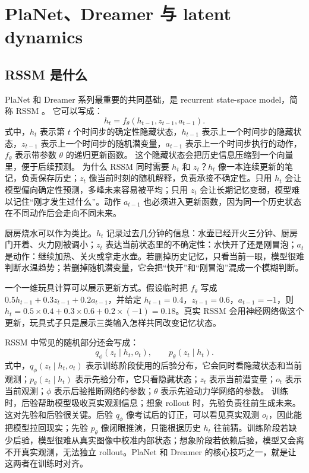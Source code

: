 \documentclass[11pt,a4paper]{ctexart}
\begin{document}
\section{PlaNet、Dreamer 与 latent dynamics}

\subsection{RSSM 是什么}

PlaNet 和 Dreamer 系列最重要的共同基础，是 recurrent state-space model，简称 RSSM \cite{hafner2019planet}。
它可以写成：
\begin{equation}
  h_t = f_\theta(h_{t-1}, z_{t-1}, a_{t-1}).
\end{equation}
式中，$h_t$ 表示第 $t$ 个时间步的确定性隐藏状态，$h_{t-1}$ 表示上一个时间步的隐藏状态，$z_{t-1}$ 表示上一个时间步的随机潜变量，$a_{t-1}$ 表示上一个时间步执行的动作，$f_\theta$ 表示带参数 $\theta$ 的递归更新函数。
这个隐藏状态会把历史信息压缩到一个向量里，便于后续预测。
为什么 RSSM 同时需要 $h_t$ 和 $z_t$？$h_t$ 像一本连续更新的笔记，负责保存历史；$z_t$ 像当前时刻的随机解释，负责承接不确定性。只用 $h_t$ 会让模型偏向确定性预测，多峰未来容易被平均；只用 $z_t$ 会让长期记忆变弱，模型难以记住“刚才发生过什么”。动作 $a_{t-1}$ 也必须进入更新函数，因为同一个历史状态在不同动作后会走向不同未来。

厨房烧水可以作为类比。$h_t$ 记录过去几分钟的信息：水壶已经开火三分钟、厨房门开着、火力刚被调小；$z_t$ 表达当前状态里的不确定性：水快开了还是刚冒泡；$a_t$ 是动作：继续加热、关火或拿走水壶。若删掉历史记忆，只看当前一眼，模型很难判断水温趋势；若删掉随机潜变量，它会把“快开”和“刚冒泡”混成一个模糊判断。

一个一维玩具计算可以展示更新方式。假设临时把 $f_\theta$ 写成 $0.5h_{t-1}+0.3z_{t-1}+0.2a_{t-1}$，并给定 $h_{t-1}=0.4$，$z_{t-1}=0.6$，$a_{t-1}=-1$，则 $h_t=0.5\times0.4+0.3\times0.6+0.2\times(-1)=0.18$。真实 RSSM 会用神经网络做这个更新，玩具式子只是展示三类输入怎样共同改变记忆状态。

RSSM 中常见的随机部分还会写成：
\begin{equation}
  q_\phi(z_t\mid h_t, o_t), \qquad p_\theta(z_t\mid h_t).
\end{equation}
式中，$q_\phi(z_t\mid h_t, o_t)$ 表示训练阶段使用的后验分布，它会同时看隐藏状态和当前观测；$p_\theta(z_t\mid h_t)$ 表示先验分布，它只看隐藏状态；$z_t$ 表示当前潜变量；$o_t$ 表示当前观测；$\phi$ 表示后验推断网络的参数；$\theta$ 表示先验动力学网络的参数。
训练时，后验帮助模型吸收真实观测信息；想象 rollout 时，先验负责往前生成未来。
这对先验和后验很关键。后验 $q_\phi$ 像考试后的订正，可以看见真实观测 $o_t$，因此能把模型拉回现实；先验 $p_\theta$ 像闭眼推演，只能根据历史 $h_t$ 往前猜。训练阶段若缺少后验，模型很难从真实图像中校准内部状态；想象阶段若依赖后验，模型又会离不开真实观测，无法独立 rollout。PlaNet 和 Dreamer 的核心技巧之一，就是让这两者在训练时对齐。
\end{document}
